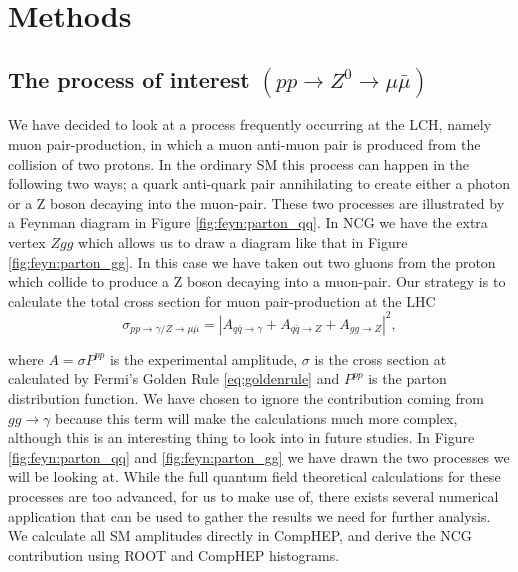 \section{Methods}

\subsection{The process of interest $(pp \rightarrow Z^0 \rightarrow \mu \bar\mu)$}
We have decided to look at a process frequently occurring at the LCH, namely muon pair-production, in which a muon anti-muon pair is produced from the collision of two protons. In the ordinary SM this process can happen in the following two ways; a quark anti-quark pair annihilating to create either a photon or a Z boson decaying into the muon-pair. These two processes are illustrated by a Feynman diagram in Figure \ref{fig:feyn:parton_qq}. In NCG we have the extra vertex $Zgg$ which allows us to draw a diagram like that in Figure \ref{fig:feyn:parton_gg}. In this case we have taken out two gluons from the proton which collide to produce a Z boson decaying into a muon-pair. Our strategy is to calculate the total cross section for muon pair-production at the LHC
\begin{equation}
	\sigma_{pp \rightarrow \gamma/ Z \rightarrow \mu \bar \mu} = |A_{q \bar q \rightarrow \gamma} + A_{q \bar q \rightarrow Z} + A_{gg \rightarrow Z}|^{2},
\end{equation}

where $A = \sigma P^{pp}$ is the experimental amplitude, $\sigma$ is the cross section at calculated by Fermi's Golden Rule \eqref{eq:goldenrule} and $P^{pp}$ is the parton distribution function. We have chosen to ignore the contribution coming from $gg \rightarrow \gamma$ because this term will make the calculations much more complex, although this is an interesting thing to look into in future studies. In Figure \ref{fig:feyn:parton_qq} and \ref{fig:feyn:parton_gg} we have drawn the two processes we will be looking at. While the full quantum field theoretical calculations for these processes are too advanced, for us to make use of, there exists several numerical application that can be used to gather the results we need for further analysis. We calculate all SM amplitudes directly in CompHEP, and derive the NCG contribution using ROOT and CompHEP histograms.

